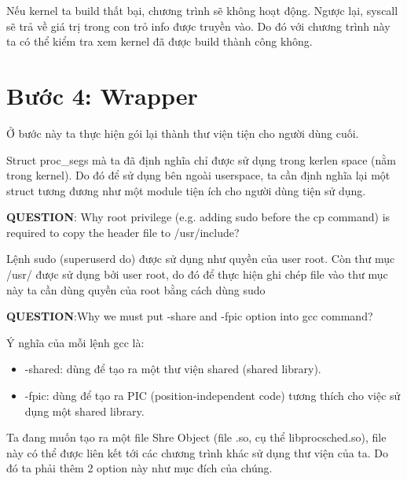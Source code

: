Nếu kernel ta build thất bại, chương trình sẽ không hoạt động. Ngược lại, syscall sẽ trả về giá trị trong con trỏ info được truyền vào. Do đó với chương trình này ta có thể kiểm tra xem kernel đã được build thành công không.



\section{Bước 4: Wrapper}

Ở bước này ta thực hiện gói lại thành thư viện tiện cho người dùng cuối.

\vspace{0.2cm}


\vspace{0.2cm}

Struct proc\_segs mà ta đã định nghĩa chỉ được sử dụng trong kerlen space (nằm trong kernel). Do đó để sử dụng bên ngoài userspace, ta cần định nghĩa lại một struct tương đương như một module tiện ích cho người dùng tiện sử dụng.

\vspace{0.3cm}

\textbf{QUESTION}: Why root privilege (e.g. adding sudo before the cp command) is required to copy the header file to /usr/include?

\vspace{0.2cm}

Lệnh sudo (superuserd do) được sử dụng như quyền của user root.
Còn thư mục /usr/ được sử dụng bởi user root, do đó để thực hiện ghi chép file vào thư mục này ta cần dùng quyền của root bằng cách dùng sudo

\vspace{0.3cm}

\textbf{QUESTION}:Why we must put -share and -fpic option into gcc command?

\vspace{0.2cm}

Ý nghĩa của mỗi lệnh gcc là:

\begin{itemize}
	\item -shared: dùng để tạo ra một thư viện shared (shared library).
	\item -fpic: dùng để tạo ra PIC (position-independent code) tương thích cho việc sử dụng một shared library.
\end{itemize}

Ta đang muốn tạo ra một file Shre Object (file .so, cụ thể libprocsched.so), file này có thể được liên kết tới các chương trình khác sử dụng thư viện của ta. Do đó ta phải thêm 2 option này như mục đích của chúng.
